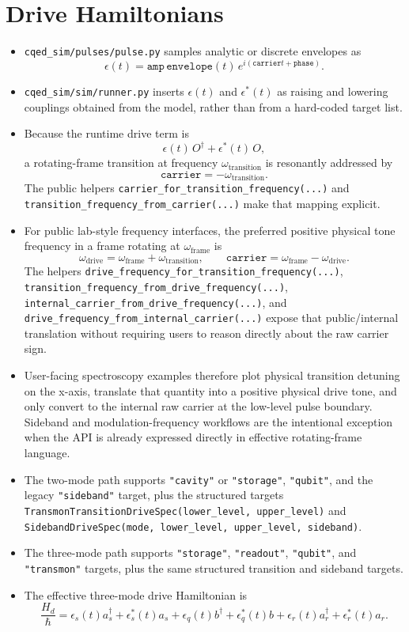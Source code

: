 \documentclass[11pt]{article}
\begin{document}
\section{Drive Hamiltonians}
\begin{itemize}[leftmargin=1.5em]
  \item \texttt{cqed\_sim/pulses/pulse.py} samples analytic or discrete envelopes as
  \[
  \epsilon(t)=\texttt{amp}\,\texttt{envelope}(t)\,e^{i(\texttt{carrier} t+\texttt{phase})}.
  \]
  \item \texttt{cqed\_sim/sim/runner.py} inserts \(\epsilon(t)\) and
  \(\epsilon^*(t)\) as raising and lowering couplings obtained from the model,
  rather than from a hard-coded target list.
  \item Because the runtime drive term is
  \[
  \epsilon(t)\,O^\dagger + \epsilon^*(t)\,O,
  \]
  a rotating-frame transition at frequency \(\omega_{\mathrm{transition}}\) is
  resonantly addressed by
  \[
  \texttt{carrier}=-\omega_{\mathrm{transition}}.
  \]
  The public helpers \texttt{carrier\_for\_transition\_frequency(...)} and
  \texttt{transition\_frequency\_from\_carrier(...)} make that mapping explicit.
  \item For public lab-style frequency interfaces, the preferred positive
  physical tone frequency in a frame rotating at
  \(\omega_{\mathrm{frame}}\) is
  \[
  \omega_{\mathrm{drive}} = \omega_{\mathrm{frame}} + \omega_{\mathrm{transition}},
  \qquad
  \texttt{carrier} = \omega_{\mathrm{frame}} - \omega_{\mathrm{drive}}.
  \]
  The helpers
  \texttt{drive\_frequency\_for\_transition\_frequency(...)},
  \texttt{transition\_frequency\_from\_drive\_frequency(...)},
  \texttt{internal\_carrier\_from\_drive\_frequency(...)}, and
  \texttt{drive\_frequency\_from\_internal\_carrier(...)} expose that
  public/internal translation without requiring users to reason directly about
  the raw carrier sign.
  \item User-facing spectroscopy examples therefore plot physical transition
  detuning on the x-axis, translate that quantity into a positive physical drive
  tone, and only convert to the internal raw carrier at the low-level pulse
  boundary. Sideband and modulation-frequency workflows are the intentional
  exception when the API is already expressed directly in effective rotating-frame
  language.
  \item The two-mode path supports \texttt{"cavity"} or \texttt{"storage"},
  \texttt{"qubit"}, and the legacy \texttt{"sideband"} target, plus the structured
  targets \texttt{TransmonTransitionDriveSpec(lower\_level, upper\_level)} and
  \texttt{SidebandDriveSpec(mode, lower\_level, upper\_level, sideband)}.
  \item The three-mode path supports \texttt{"storage"}, \texttt{"readout"},
  \texttt{"qubit"}, and \texttt{"transmon"} targets, plus the same structured
  transition and sideband targets.
  \item The effective three-mode drive Hamiltonian is
  \[
  \frac{H_d}{\hbar}
  =
  \epsilon_s(t) a_s^\dagger + \epsilon_s^*(t) a_s
  +
  \epsilon_q(t) b^\dagger + \epsilon_q^*(t) b
  +
  \epsilon_r(t) a_r^\dagger + \epsilon_r^*(t) a_r .
  \]
\end{itemize}
\end{document}
